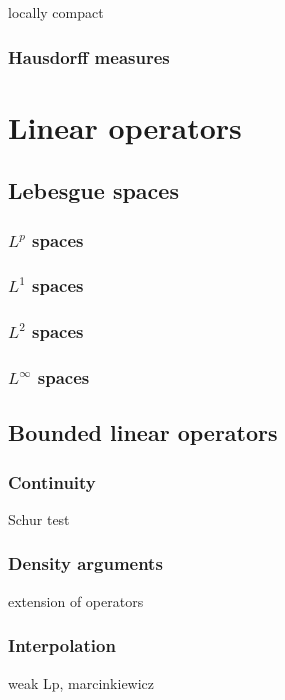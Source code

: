 \documentclass{../note}
\begin{document}
locally compact

\section{Hausdorff measures}









\part{Linear operators}



\chapter{Lebesgue spaces}
\section{$L^p$ spaces}
\section{$L^1$ spaces}
\section{$L^2$ spaces}
\section{$L^\infty$ spaces}








\chapter{Bounded linear operators}
\section{Continuity}
Schur test

\section{Density arguments}
extension of operators

\section{Interpolation}
weak Lp, marcinkiewicz
\end{document}
